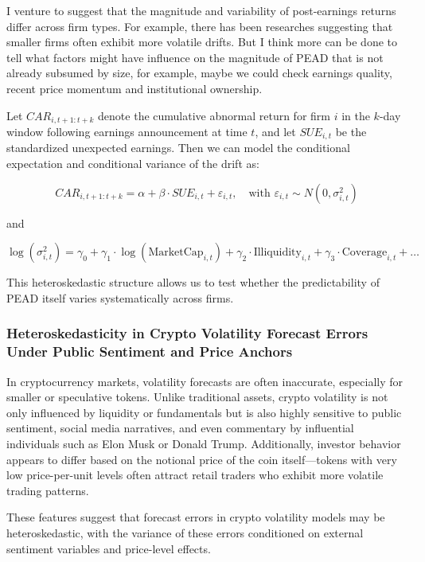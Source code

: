I venture to suggest that the magnitude and variability of post-earnings returns differ across firm types. For example, there has been researches suggesting that smaller firms often exhibit more volatile drifts. But I think more can be done to tell what factors might have influence on the magnitude of PEAD that is not already subsumed by size, for example, maybe we could check earnings quality, recent price momentum and institutional ownership.

Let $CAR_{i,t+1:t+k}$ denote the cumulative abnormal return for firm $i$ in the $k$-day window following earnings announcement at time $t$, and let $SUE_{i,t}$ be the standardized unexpected earnings. Then we can model the conditional expectation and conditional variance of the drift as:

\begin{equation}
CAR_{i,t+1:t+k} = \alpha + \beta \cdot SUE_{i,t} + \varepsilon_{i,t}, \quad \text{with } \varepsilon_{i,t} \sim N(0, \sigma_{i,t}^2)
\end{equation}

and

\begin{equation}
\log(\sigma_{i,t}^2) = \gamma_0 + \gamma_1 \cdot \log(\text{MarketCap}_{i,t}) + \gamma_2 \cdot \text{Illiquidity}_{i,t} + \gamma_3 \cdot \text{Coverage}_{i,t} + \ldots
\end{equation}

This heteroskedastic structure allows us to test whether the predictability of PEAD itself varies systematically across firms. 

\subsubsection*{Heteroskedasticity in Crypto Volatility Forecast Errors Under Public Sentiment and Price Anchors}

In cryptocurrency markets, volatility forecasts are often inaccurate, especially for smaller or speculative tokens. Unlike traditional assets, crypto volatility is not only influenced by liquidity or fundamentals but is also highly sensitive to public sentiment, social media narratives, and even commentary by influential individuals such as Elon Musk or Donald Trump. Additionally, investor behavior appears to differ based on the notional price of the coin itself—tokens with very low price-per-unit levels often attract retail traders who exhibit more volatile trading patterns.

These features suggest that forecast errors in crypto volatility models may be heteroskedastic, with the variance of these errors conditioned on external sentiment variables and price-level effects.


